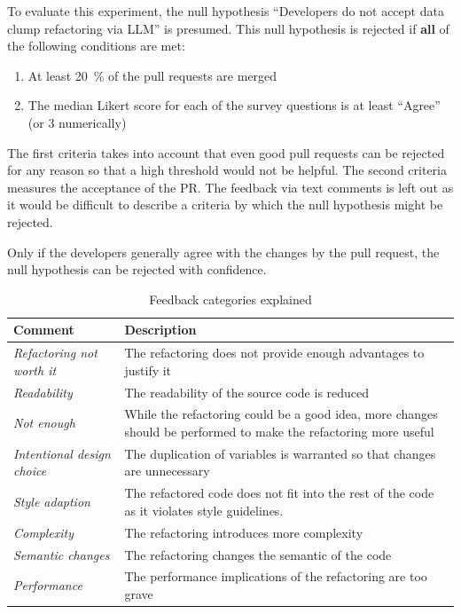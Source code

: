 To evaluate this experiment, the null hypothesis \enquote{Developers do not accept data clump refactoring via \ac{LLM}} is presumed. This null hypothesis is rejected if \textbf{all} of the following conditions are met:

\begin{enumerate}
    \item At least 20~\% of the pull requests are merged
    \item The median Likert score for each of the survey questions is at least \enquote{Agree} (or 3 numerically)
\end{enumerate}

The first criteria takes into account that even good pull requests can be rejected for any reason so that a high threshold would not be helpful. The second criteria measures the acceptance of the PR. The feedback via text comments is left out as it would be difficult to describe a criteria by which the null hypothesis might be rejected.

Only if the developers generally agree with the changes by the pull request, the null hypothesis can be rejected with confidence. 


\begin{table}
\begin{tabular}{p{4cm}|p{10cm}}
	Comment & Description\\\hline
	\textit{Refactoring not worth it} & The refactoring does not provide enough advantages to justify it\\\hline
	\textit{Readability} & The readability of the source code is reduced \\\hline
	\textit{Not enough} & While the refactoring could be a good idea, more changes should be performed to make the refactoring more useful \\\hline
	\textit{Intentional design choice} & The duplication of variables is warranted so that changes are unnecessary \\\hline
	\textit{Style adaption} & The refactored code does not fit into the rest of the code as it violates style guidelines. \\\hline
	\textit{Complexity} & The refactoring introduces more complexity\\\hline
	\textit{Semantic changes} &  The refactoring changes the semantic of the code\\\hline
	\textit{Performance}& The performance implications of the refactoring are too grave \\\hline
	
\end{tabular}
\caption{Feedback categories explained}
\label{tbl:feedback_categories}
\end{table} 




